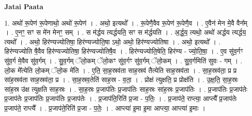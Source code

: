 \documentclass[17pt]{extarticle}
\begin{document}
\textbf{Jatai Paata} \newline

1. अथो॑ रू॒पेण॑ रू॒पेणाथो॒ अथो॑ रू॒पेण॑ । . अथो॒ इत्यथो᳚ । . रू॒पेणै॒वैव रू॒पेण॑ रू॒पेणै॒व । . ए॒वैन॑ मेन मे॒वै वैन᳚म् । . ए॒नꣳ॒॒ सꣳ स मे॑न मेनꣳ॒॒ सम् । . स म॑र्द्धय त्यर्द्धयति॒ सꣳ स म॑र्द्धयति । . अ॒र्द्ध॒य॒ त्यथो॒ अथो॑ अर्द्धय त्यर्द्धय॒ त्यथो᳚ । . अथो॒ हिर॑ण्यज्योतिषा॒ हिर॑ण्यज्योति॒षा ऽथो॒ अथो॒ हिर॑ण्यज्योतिषा । . अथो॒ इत्यथो᳚ । . हिर॑ण्यज्योति षै॒वैव हिर॑ण्यज्योतिषा॒ हिर॑ण्यज्योतिषै॒व । . हिर॑ण्यज्योति॒षेति॒ हिर॑ण्य - ज्यो॒ति॒षा॒ । . ए॒व सु॑व॒र्गꣳ सु॑व॒र्ग मे॒वैव सु॑व॒र्गम् । . सु॒व॒र्गम् ॅलो॒कम् ॅलो॒कꣳ सु॑व॒र्गꣳ सु॑व॒र्गम् ॅलो॒कम् । . सु॒व॒र्गमिति॑ सुवः - गम् । . लो॒क मे᳚त्येति लो॒कम् ॅलो॒क मे॑ति । . ए॒ति॒ सा॒ह॒स्रव॑ता साह॒स्रव॑ तैत्येति साह॒स्रव॑ता । . सा॒ह॒स्रव॑ता॒ प्र प्र सा॑ह॒स्रव॑ता साह॒स्रव॑ता॒ प्र । . सा॒ह॒स्रव॒तेति॑ साह॒स्र - व॒ता॒ । . प्रोक्ष॑ त्युक्षति॒ प्र प्रोक्ष॑ति । . उ॒क्ष॒ति॒ सा॒ह॒स्रः सा॑ह॒स्र उ॑क्ष त्युक्षति साह॒स्रः । . सा॒ह॒स्रः प्र॒जाप॑तिः प्र॒जाप॑तिः साह॒स्रः सा॑ह॒स्रः प्र॒जाप॑तिः । . प्र॒जाप॑तिः प्र॒जाप॑तेः प्र॒जाप॑तेः प्र॒जाप॑तिः प्र॒जाप॑तिः प्र॒जाप॑तेः । . प्र॒जाप॑ति॒रिति॑ प्र॒जा - प॒तिः॒ । . प्र॒जाप॑ते॒ राप्त्या॒ आप्त्यै᳚ प्र॒जाप॑तेः प्र॒जाप॑ते॒ राप्त्यै᳚ । . प्र॒जाप॑ते॒रिति॑ प्र॒जा - प॒तेः॒ । . आप्त्या॑ इ॒मा इ॒मा आप्त्या॒ आप्त्या॑ इ॒माः । \newline
\end{document}
